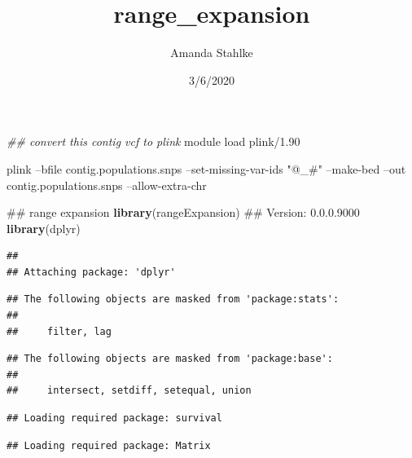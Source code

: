 \documentclass[]{article}
\title{range\_expansion}
\author{Amanda Stahlke}
\date{3/6/2020}
\newenvironment{Shaded}{\begin{snugshade}}{\end{snugshade}}
\newcommand{\KeywordTok}[1]{\textcolor[rgb]{0.13,0.29,0.53}{\textbf{#1}}}
\newcommand{\StringTok}[1]{\textcolor[rgb]{0.31,0.60,0.02}{#1}}
\newcommand{\CommentTok}[1]{\textcolor[rgb]{0.56,0.35,0.01}{\textit{#1}}}
\newcommand{\ExtensionTok}[1]{#1}
\newcommand{\NormalTok}[1]{#1}
\begin{document}
\maketitle

\begin{Shaded}
\begin{Highlighting}[]
\CommentTok{## convert this contig vcf to plink}
\ExtensionTok{module}\NormalTok{ load plink/1.90}

\ExtensionTok{plink}\NormalTok{ --bfile contig.populations.snps --set-missing-var-ids }\StringTok{"@_#"}\NormalTok{ --make-bed --out contig.populations.snps --allow-extra-chr}
\end{Highlighting}
\end{Shaded}

\begin{Shaded}
\begin{Highlighting}[]
\NormalTok{## range expansion}
\KeywordTok{library}\NormalTok{(rangeExpansion) ## Version: 0.0.0.9000}
\KeywordTok{library}\NormalTok{(dplyr)}
\end{Highlighting}
\end{Shaded}

\begin{verbatim}
## 
## Attaching package: 'dplyr'
\end{verbatim}

\begin{verbatim}
## The following objects are masked from 'package:stats':
## 
##     filter, lag
\end{verbatim}

\begin{verbatim}
## The following objects are masked from 'package:base':
## 
##     intersect, setdiff, setequal, union
\end{verbatim}

\begin{Shaded}
\end{Shaded}

\begin{verbatim}
## Loading required package: survival
\end{verbatim}

\begin{verbatim}
## Loading required package: Matrix
\end{verbatim}
\end{document}
